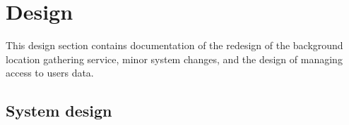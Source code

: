 \section{Design}
This design section contains documentation of the redesign of the background location gathering service, minor system changes, and the design of managing access to users data.

\subsection{System design}




